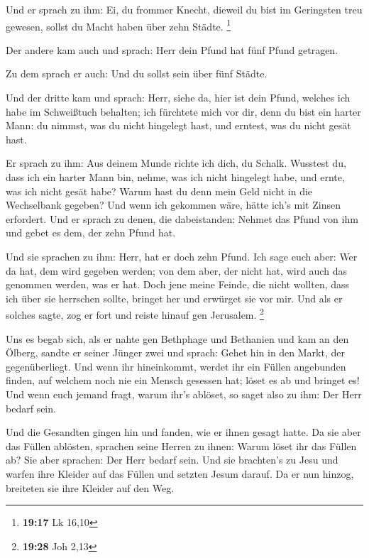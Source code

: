  Und er sprach zu ihm: Ei, du frommer Knecht, dieweil du
bist im Geringsten treu gewesen, sollst du Macht haben über zehn Städte.
\footnote{\textbf{19:17} Lk 16,10}

 Der andere kam auch und sprach: Herr dein Pfund hat fünf
Pfund getragen.

 Zu dem sprach er auch: Und du sollst sein über fünf
Städte.

 Und der dritte kam und sprach: Herr, siehe da, hier ist
dein Pfund, welches ich habe im Schweißtuch behalten;  ich
fürchtete mich vor dir, denn du bist ein harter Mann: du nimmst, was du
nicht hingelegt hast, und erntest, was du nicht gesät hast.

 Er sprach zu ihm: Aus deinem Munde richte ich dich, du
Schalk. Wusstest du, dass ich ein harter Mann bin, nehme, was ich nicht
hingelegt habe, und ernte, was ich nicht gesät habe?  Warum
hast du denn mein Geld nicht in die Wechselbank gegeben? Und wenn ich
gekommen wäre, hätte ich's mit Zinsen erfordert.  Und er
sprach zu denen, die dabeistanden: Nehmet das Pfund von ihm und gebet es
dem, der zehn Pfund hat.

 Und sie sprachen zu ihm: Herr, hat er doch zehn Pfund.
 Ich sage euch aber: Wer da hat, dem wird gegeben werden;
von dem aber, der nicht hat, wird auch das genommen werden, was er hat.
 Doch jene meine Feinde, die nicht wollten, dass ich über
sie herrschen sollte, bringet her und erwürget sie vor mir.
 Und als er solches sagte, zog er fort und reiste hinauf
gen Jerusalem. \footnote{\textbf{19:28} Joh 2,13}

 Uns es begab sich, als er nahte gen Bethphage und
Bethanien und kam an den Ölberg, sandte er seiner Jünger zwei
 und sprach: Gehet hin in den Markt, der gegenüberliegt.
Und wenn ihr hineinkommt, werdet ihr ein Füllen angebunden finden, auf
welchem noch nie ein Mensch gesessen hat; löset es ab und bringet es!
 Und wenn euch jemand fragt, warum ihr's ablöset, so saget
also zu ihm: Der Herr bedarf sein.

 Und die Gesandten gingen hin und fanden, wie er ihnen
gesagt hatte.  Da sie aber das Füllen ablösten, sprachen
seine Herren zu ihnen: Warum löset ihr das Füllen ab?  Sie
aber sprachen: Der Herr bedarf sein.  Und sie brachten's zu
Jesu und warfen ihre Kleider auf das Füllen und setzten Jesum darauf.
 Da er nun hinzog, breiteten sie ihre Kleider auf den Weg.

